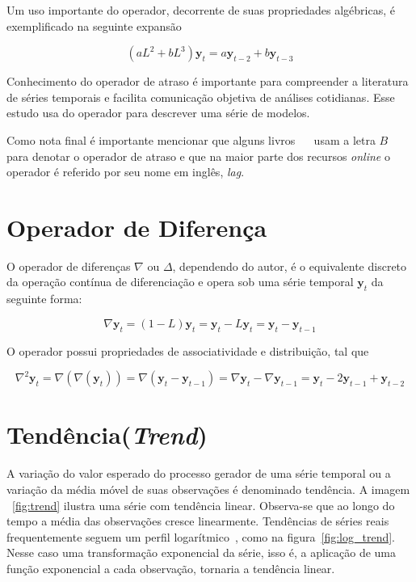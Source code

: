 \vspace{1cm}

Um uso importante do operador, decorrente de suas propriedades algébricas, é
exemplificado na seguinte expansão

$$ (aL^2 + bL^3) \mathbf{y}_{t} =  a\mathbf{y}_{t-2} + b\mathbf{y}_{t-3}$$

Conhecimento do operador de atraso é importante para compreender a literatura
de séries temporais e facilita comunicação objetiva de análises cotidianas.
Esse estudo usa do operador para descrever uma série de modelos.

Como nota final é importante mencionar que alguns livros~\cite{chatfield}
~\cite{stoffer} usam a letra $B$ para denotar o operador de atraso e que na
maior parte dos recursos \emph{online} o operador é referido por seu nome em
inglês, \emph{lag}.

\section{Operador de Diferença}\label{sec:diff}

O operador de diferenças $\nabla$ ou  $\Delta$, dependendo do autor, é o
equivalente discreto da operação contínua de diferenciação e opera sob uma
série temporal $\mathbf{y}_t$ da seguinte forma:

$$ \nabla \mathbf{y}_t = (1 - L)\mathbf{y}_t = \mathbf{y}_t - L\mathbf{y}_t = \mathbf{y}_t - \mathbf{y}_{t-1} $$

O operador possui propriedades de associatividade e distribuição, tal que

$$ \nabla^2 \mathbf{y}_t = \nabla(\nabla(\mathbf{y}_t)) = \nabla(\mathbf{y}_t - \mathbf{y}_{t-1}) = \nabla \mathbf{y}_t - \nabla \mathbf{y}_{t-1} = \mathbf{y}_t - 2 \mathbf{y}_{t-1} + \mathbf{y}_{t-2} $$

\section{Tendência(\emph{Trend})}

A variação do valor esperado do processo gerador de uma série temporal ou a
variação da média móvel de suas observações é denominado tendência. A imagem
~\ref{fig:trend} ilustra uma série com tendência linear. Observa-se que ao
longo do tempo a média das observações cresce linearmente. Tendências de séries
reais frequentemente seguem um perfil logarítmico~\cite{chatfield}, como na
figura~\ref{fig:log_trend}. Nesse caso uma transformação exponencial da série,
isso é, a aplicação de uma função exponencial a cada observação, tornaria a
tendência linear.


